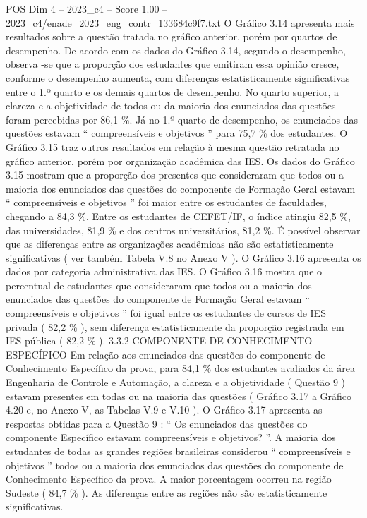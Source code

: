 \begin{textsample}{POS Dim 4 – 2023\_c4 – Score 1.00 – 2023\_c4/enade\_2023\_eng\_contr\_133684c9f7.txt}
O Gráfico 3.14 apresenta mais resultados sobre a questão tratada no gráfico anterior, porém por quartos de desempenho.
De acordo com os dados do Gráfico 3.14, segundo o desempenho, observa -se que a proporção dos estudantes que emitiram essa opinião cresce, conforme o desempenho aumenta, com diferenças estatisticamente significativas entre o 1.º quarto e os demais quartos de desempenho.
No quarto superior, a clareza e a objetividade de todos ou da maioria dos enunciados das questões foram percebidas por 86,1 \%.
Já no 1.º quarto de desempenho, os enunciados das questões estavam “ compreensíveis e objetivos ” para 75,7 \% dos estudantes.
O Gráfico 3.15 traz outros resultados em relação à mesma questão retratada no gráfico anterior, porém por organização acadêmica das IES.
Os dados do Gráfico 3.15 mostram que a proporção dos presentes que consideraram que todos ou a maioria dos enunciados das questões do componente de Formação Geral estavam “ compreensíveis e objetivos ” foi maior entre os estudantes de faculdades, chegando a 84,3 \%.
Entre os estudantes de CEFET/IF, o índice atingiu 82,5 \%, das universidades, 81,9 \% e dos centros universitários, 81,2 \%.
É possível observar que as diferenças entre as organizações acadêmicas não são estatisticamente significativas ( ver também Tabela V.8 no Anexo V ).
O Gráfico 3.16 apresenta os dados por categoria administrativa das IES.
O Gráfico 3.16 mostra que o percentual de estudantes que consideraram que todos ou a maioria dos enunciados das questões do componente de Formação Geral estavam “ compreensíveis e objetivos ” foi igual entre os estudantes de cursos de IES privada ( 82,2 \% ), sem diferença estatisticamente da proporção registrada em IES pública ( 82,2 \% ). 3.3.2 COMPONENTE DE CONHECIMENTO ESPECÍFICO Em relação aos enunciados das questões do componente de Conhecimento Específico da prova, para 84,1 \% dos estudantes avaliados da área Engenharia de Controle e Automação, a clareza e a objetividade ( Questão 9 ) estavam presentes em todas ou na maioria das questões ( Gráfico 3.17 a Gráfico 4.20 e, no Anexo V, as Tabelas V.9 e V.10 ).
O Gráfico 3.17 apresenta as respostas obtidas para a Questão 9 : “ Os enunciados das questões do componente Específico estavam compreensíveis e objetivos? ”.
A maioria dos estudantes de todas as grandes regiões brasileiras considerou “ compreensíveis e objetivos ” todos ou a maioria dos enunciados das questões do componente de Conhecimento Específico da prova.
A maior porcentagem ocorreu na região Sudeste ( 84,7 \% ).
As diferenças entre as regiões não são estatisticamente significativas.

\end{textsample}
